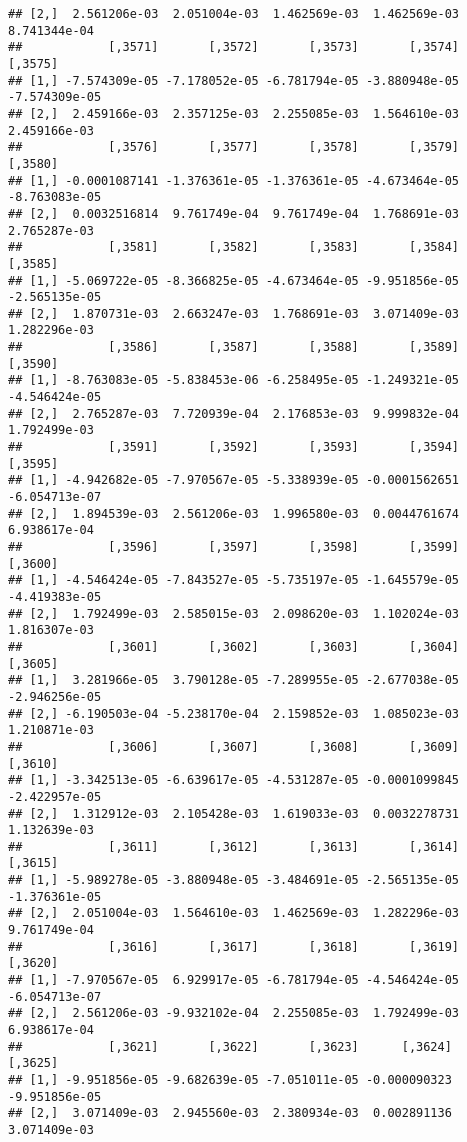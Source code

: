 \documentclass[
]{article}
\begin{document}
\begin{verbatim}
## [2,]  2.561206e-03  2.051004e-03  1.462569e-03  1.462569e-03  8.741344e-04
##            [,3571]       [,3572]       [,3573]       [,3574]       [,3575]
## [1,] -7.574309e-05 -7.178052e-05 -6.781794e-05 -3.880948e-05 -7.574309e-05
## [2,]  2.459166e-03  2.357125e-03  2.255085e-03  1.564610e-03  2.459166e-03
##            [,3576]       [,3577]       [,3578]       [,3579]       [,3580]
## [1,] -0.0001087141 -1.376361e-05 -1.376361e-05 -4.673464e-05 -8.763083e-05
## [2,]  0.0032516814  9.761749e-04  9.761749e-04  1.768691e-03  2.765287e-03
##            [,3581]       [,3582]       [,3583]       [,3584]       [,3585]
## [1,] -5.069722e-05 -8.366825e-05 -4.673464e-05 -9.951856e-05 -2.565135e-05
## [2,]  1.870731e-03  2.663247e-03  1.768691e-03  3.071409e-03  1.282296e-03
##            [,3586]       [,3587]       [,3588]       [,3589]       [,3590]
## [1,] -8.763083e-05 -5.838453e-06 -6.258495e-05 -1.249321e-05 -4.546424e-05
## [2,]  2.765287e-03  7.720939e-04  2.176853e-03  9.999832e-04  1.792499e-03
##            [,3591]       [,3592]       [,3593]       [,3594]       [,3595]
## [1,] -4.942682e-05 -7.970567e-05 -5.338939e-05 -0.0001562651 -6.054713e-07
## [2,]  1.894539e-03  2.561206e-03  1.996580e-03  0.0044761674  6.938617e-04
##            [,3596]       [,3597]       [,3598]       [,3599]       [,3600]
## [1,] -4.546424e-05 -7.843527e-05 -5.735197e-05 -1.645579e-05 -4.419383e-05
## [2,]  1.792499e-03  2.585015e-03  2.098620e-03  1.102024e-03  1.816307e-03
##            [,3601]       [,3602]       [,3603]       [,3604]       [,3605]
## [1,]  3.281966e-05  3.790128e-05 -7.289955e-05 -2.677038e-05 -2.946256e-05
## [2,] -6.190503e-04 -5.238170e-04  2.159852e-03  1.085023e-03  1.210871e-03
##            [,3606]       [,3607]       [,3608]       [,3609]       [,3610]
## [1,] -3.342513e-05 -6.639617e-05 -4.531287e-05 -0.0001099845 -2.422957e-05
## [2,]  1.312912e-03  2.105428e-03  1.619033e-03  0.0032278731  1.132639e-03
##            [,3611]       [,3612]       [,3613]       [,3614]       [,3615]
## [1,] -5.989278e-05 -3.880948e-05 -3.484691e-05 -2.565135e-05 -1.376361e-05
## [2,]  2.051004e-03  1.564610e-03  1.462569e-03  1.282296e-03  9.761749e-04
##            [,3616]       [,3617]       [,3618]       [,3619]       [,3620]
## [1,] -7.970567e-05  6.929917e-05 -6.781794e-05 -4.546424e-05 -6.054713e-07
## [2,]  2.561206e-03 -9.932102e-04  2.255085e-03  1.792499e-03  6.938617e-04
##            [,3621]       [,3622]       [,3623]      [,3624]       [,3625]
## [1,] -9.951856e-05 -9.682639e-05 -7.051011e-05 -0.000090323 -9.951856e-05
## [2,]  3.071409e-03  2.945560e-03  2.380934e-03  0.002891136  3.071409e-03

\end{verbatim}
\end{document}
